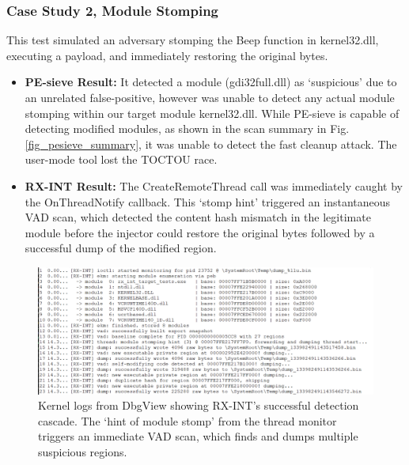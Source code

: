 \documentclass[journal]{IEEEtran}
\begin{document}
\subsubsection{Case Study 2, Module Stomping}
This test simulated an adversary stomping the Beep function in kernel32.dll, executing a payload, and immediately restoring the original bytes.
\begin{itemize}
\item \textbf{PE-sieve Result:} It detected a module (gdi32full.dll) as `suspicious' due to an unrelated false-positive, however was unable to detect any actual module stomping within our target module kernel32.dll. While PE-sieve is capable of detecting modified modules, as shown in the scan summary in Fig. \ref{fig_pesieve_summary}, it was unable to detect the fast cleanup attack. The user-mode tool lost the TOCTOU race.
\item \textbf{RX-INT Result:} The CreateRemoteThread call was immediately caught by the OnThreadNotify callback. This `stomp hint' triggered an instantaneous VAD scan, which detected the content hash mismatch in the legitimate module before the injector could restore the original bytes followed by a successful dump of the modified region.
\end{itemize}
\begin{figure}[!t]
\centering
\includegraphics[width=\columnwidth]{figures/dbgview_modulestomp.png}
\caption{Kernel logs from DbgView showing RX-INT's successful detection cascade. The `hint of module stomp' from the thread monitor triggers an immediate VAD scan, which finds and dumps multiple suspicious regions.}
\label{fig_dbgview_modulestomp}
\end{figure}
\end{document}
